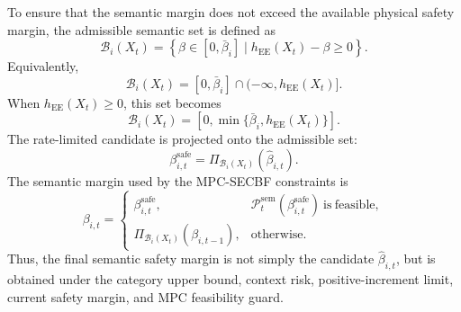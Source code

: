 \documentclass[journal]{IEEEtranTIE}
\begin{document}
    To ensure that the semantic margin does not exceed the available physical
    safety margin, the admissible semantic set is defined as
    \begin{equation}
    \mathcal{B}_i(X_t)=
    \left\{
    \beta\in[0,\bar{\beta}_i]\mid
    h_{\mathrm{EE}}(X_t)-\beta\ge0
    \right\}.
    \end{equation}
    Equivalently,
    \begin{equation}
    \mathcal{B}_i(X_t)
    =
    [0,\bar{\beta}_i]\cap(-\infty,h_{\mathrm{EE}}(X_t)].
    \end{equation}
    When $h_{\mathrm{EE}}(X_t)\ge0$, this set becomes
    \begin{equation}
    \mathcal{B}_i(X_t)
    =
    \left[
    0,\min\{\bar{\beta}_i,h_{\mathrm{EE}}(X_t)\}
    \right].
    \end{equation}
    The rate-limited candidate is projected onto the admissible set:
    \begin{equation}
    \beta_{i,t}^{\mathrm{safe}}
    =
    \Pi_{\mathcal{B}_i(X_t)}(\hat{\beta}_{i,t}).
    \end{equation}
    The semantic margin used by the MPC-SECBF constraints is
    \begin{equation}
    \beta_{i,t}=
    \begin{cases}
    \beta_{i,t}^{\mathrm{safe}},
    & \mathcal{P}_t^{\mathrm{sem}}(\beta_{i,t}^{\mathrm{safe}})
    \ \mathrm{is\ feasible},\\[1mm]
    \Pi_{\mathcal{B}_i(X_t)}(\beta_{i,t-1}),
    & \mathrm{otherwise}.
    \end{cases}
    \end{equation}
    Thus, the final semantic safety margin is not simply the candidate
    $\hat{\beta}_{i,t}$, but is obtained under the category upper bound, context
    risk, positive-increment limit, current safety margin, and MPC feasibility
    guard.
\end{document}
